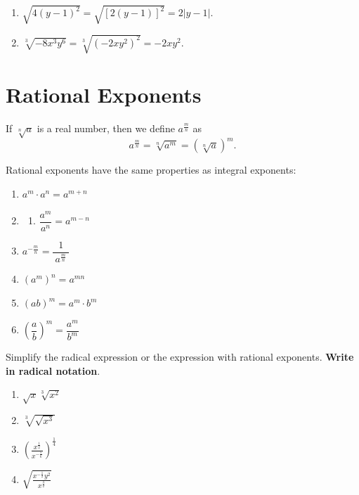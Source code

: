 \documentclass[en,12pt]{elegantbook}
\providecommand{\tightlist}{%
  \setlength{\itemsep}{0pt}\setlength{\parskip}{0pt}}
\providecommand{\tightlist}{%
  \setlength{\itemsep}{0pt}\setlength{\parskip}{0pt}}
\let\BeginKnitrBlock\begin \let\EndKnitrBlock\end
\begin{document}
\BeginKnitrBlock{solution}


\begin{enumerate}
\def\labelenumi{\arabic{enumi}.}
\tightlist
\item
  \(\sqrt{4(y-1)^2}=\sqrt{[2(y-1)]^2}=2|y-1|\).
\item
  \(\sqrt[3]{-8x^3y^6}=\sqrt[3]{(-2xy^2)^2}=-2xy^2\).
\end{enumerate}
\EndKnitrBlock{solution}

\hypertarget{rational-exponents}{%
\section{Rational Exponents}\label{rational-exponents}}

If \(\sqrt[n]{a}\) is a real number, then we define \(a^{\frac mn}\) as
\[
a^{\frac mn}=\sqrt[n]{a^m}=(\sqrt[n]{a})^m.
\]

Rational exponents have the same properties as integral exponents:

\begin{enumerate}
\def\labelenumi{\arabic{enumi}.}
\item
  \(a^m\cdot a^n=a^{m+n}\)
\item
  \begin{enumerate}
  \def\labelenumii{\arabic{enumii}.}
  \tightlist
  \item
    \(\dfrac{a^m}{a^n}=a^{m-n}\)
  \end{enumerate}
\item
  \(a^{-\frac mn}=\dfrac{~1~}{~a^{\frac mn}~}\)\\
\item
  \((a^m)^n=a^{mn}\)
\item
  \((ab)^m=a^m\cdot b^m\)
\item
  \(\left(\dfrac ab\right)^m=\dfrac{a^m}{b^m}\)\\
\end{enumerate}

\BeginKnitrBlock{example}
\protect\hypertarget{exm:unnamed-chunk-71}{}{\label{exm:unnamed-chunk-71} }
Simplify the radical expression or the expression with rational exponents. \textbf{Write in radical notation}.

\begin{enumerate}
\def\labelenumi{\arabic{enumi}.}
\tightlist
\item
  \(\sqrt{x}\sqrt[3]{x^2}\)
\item
  \(\sqrt[3]{\sqrt{x^3}}\)
\item
  \(\left(\frac{x^{\frac12}}{x^{-\frac56}}\right )^{\frac14}\)
\item
  \(\sqrt{\frac{x^{-\frac12}y^2}{x^{\frac32}}}\)
\end{enumerate}
\EndKnitrBlock{example}
\end{document}
